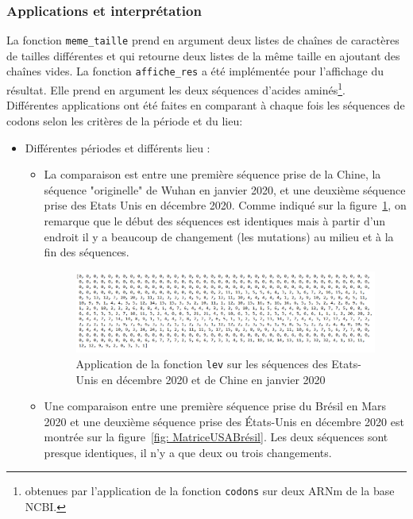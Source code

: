 \documentclass[12pt]{article}
\begin{document}
\subsubsection{Applications et interprétation}
La fonction \texttt{meme\_taille} prend en argument deux listes de chaînes de caractères de tailles différentes et qui retourne deux listes de la même taille en ajoutant des chaînes vides.
La fonction \texttt{affiche\_res} a été implémentée pour l'affichage du résultat. Elle prend en argument les deux séquences d'acides aminés\footnote{obtenues par l'application de la fonction \texttt{codons} sur deux ARNm de la base NCBI.}. \\
Différentes applications ont été faites en comparant à chaque fois les séquences de codons selon les critères de la période et du lieu: 
\begin{itemize}[label=\textbullet]%
    \item Différentes périodes et différents lieu : 
    \begin{itemize}
        \item La comparaison est entre une première séquence prise de la Chine, la séquence "originelle" de Wuhan en janvier 2020, et une deuxième séquence prise des Etats Unis en décembre 2020. 
        Comme indiqué sur la figure~\ref{fig: MatriceUSAchine}, on remarque que le début des séquences est identiques mais à partir d'un endroit il y a beaucoup de changement (les mutations) au milieu et à la fin des séquences.
        
    \begin{figure}[!h]
        \centering
        \includegraphics[scale = 0.65]{Images/Levenstein/USAChina DIFFERENTE PERIODE DIFFERENT LIEU.png}
        \caption{Application de la fonction \texttt{lev} sur les séquences des Etats-Unis en décembre 2020 et de Chine en janvier 2020 }
        \label{fig: MatriceUSAchine}
    \end{figure}
    
        \item Une comparaison entre une première séquence prise du Brésil en Mars 2020 et une deuxième séquence prise des États-Unis en décembre 2020 est montrée sur la figure~\ref{fig: MatriceUSABrésil}. Les deux séquences sont presque identiques, il n'y a que deux ou trois changements.\\
        

\end{itemize}
\end{itemize}
\end{document}

